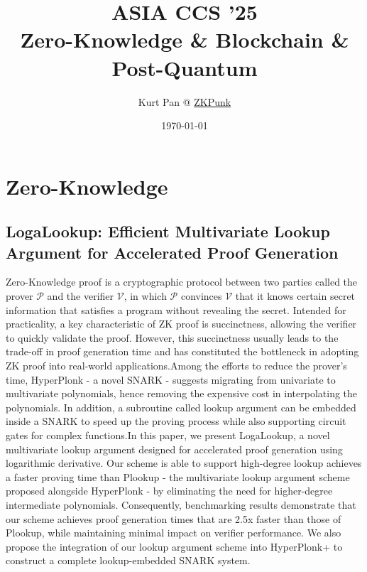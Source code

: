 \documentclass[11pt]{article}
\theoremstyle{definition}
\theoremstyle{remark}
\theoremstyle{plain}
\begin{document}
\title{ASIA CCS '25 \\ \small{Zero-Knowledge \& Blockchain \& Post-Quantum}}
\author{Kurt Pan @ \href{https://zkpunk.pro}{ZKPunk}}
\date{\today}
\maketitle
\tableofcontents

\section{Zero-Knowledge}
\subsection{\cite{10.1145/3708821.3736204} LogaLookup: Efficient Multivariate Lookup Argument for Accelerated Proof Generation}
Zero-Knowledge proof is a cryptographic protocol between two parties called the prover $\mathcal{P}$ and the verifier $\mathcal{V}$, in which $\mathcal{P}$ convinces $\mathcal{V}$ that it knows certain secret information that satisfies a program without revealing the secret. Intended for practicality, a key characteristic of ZK proof is succinctness, allowing the verifier to quickly validate the proof. However, this succinctness usually leads to the trade-off in proof generation time and has constituted the bottleneck in adopting ZK proof into real-world applications.Among the efforts to reduce the prover’s time, HyperPlonk - a novel SNARK - suggests migrating from univariate to multivariate polynomials, hence removing the expensive cost in interpolating the polynomials. In addition, a subroutine called lookup argument can be embedded inside a SNARK to speed up the proving process while also supporting circuit gates for complex functions.In this paper, we present LogaLookup, a novel multivariate lookup argument designed for accelerated proof generation using logarithmic derivative. Our scheme is able to support high-degree lookup achieves a faster proving time than Plookup - the multivariate lookup argument scheme proposed alongside HyperPlonk - by eliminating the need for higher-degree intermediate polynomials. Consequently, benchmarking results demonstrate that our scheme achieves proof generation times that are 2.5x faster than those of Plookup, while maintaining minimal impact on verifier performance. We also propose the integration of our lookup argument scheme into HyperPlonk+ to construct a complete lookup-embedded SNARK system.
\end{document}
